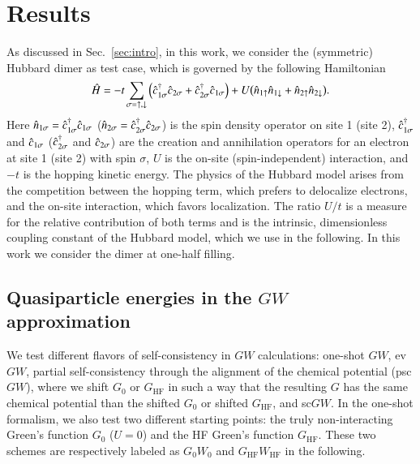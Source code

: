 \documentclass[aps,prb,reprint,superscriptaddress]{revtex4-1}
\begin{document}
\section{Results}
\label{sec:Results}
As discussed in Sec.~\ref{sec:intro}, in this work, we consider the (symmetric) Hubbard dimer as test case, which is governed by the following Hamiltonian
\begin{equation}
 \label{Eqn:Hamiltonian}
 \Hat{H} 
 =-t \sum_{\sigma=\uparrow,\downarrow} \qty( \Hat{c}^{\dagger}_{1\sigma} \Hat{c}_{2\sigma} + \Hat{c}^{\dagger}_{2\sigma} \Hat{c}_{1\sigma} )
 + U \qty( \Hat{n}_{1\uparrow} \Hat{n}_{1\downarrow}+\Hat{n}_{2\uparrow} \Hat{n}_{2\downarrow} ).
 \end{equation}
Here $\Hat{n}_{1\sigma}=\Hat{c}^{\dagger}_{1\sigma} \Hat{c}_{1\sigma}$ ($\Hat{n}_{2\sigma}=\Hat{c}^{\dagger}_{2\sigma} \Hat{c}_{2\sigma}$) is the spin density operator on site 1 (site 2), $\Hat{c}^{\dagger}_{1\sigma}$ and $\Hat{c}_{1\sigma}$ ($\Hat{c}^{\dagger}_{2\sigma}$ and $\Hat{c}_{2\sigma}$) are the creation and annihilation operators for an electron at site 1 (site 2) with spin $\sigma$, $U$ is the on-site (spin-independent) interaction, and $-t$ is the hopping kinetic energy. The physics of the Hubbard model arises from the competition between the hopping term, which prefers to delocalize electrons, and the on-site interaction, which favors localization. The ratio $U/t$ is a measure for the relative contribution of both terms and is the intrinsic, dimensionless coupling constant of the Hubbard model, which we use in the following. 
In this work we consider the dimer at one-half filling.


\subsection{Quasiparticle energies in the $GW$ approximation}
We test different flavors of self-consistency in $GW$ calculations: one-shot $GW$, ev$GW$, partial self-consistency through the alignment of the chemical potential (psc$GW$), where we shift $G_0$ or $G_\text{HF}$ in such a way that the resulting $G$ has the same chemical potential than the shifted $G_0$ or shifted $G_\text{HF}$,\citep{Schindlmayr_1997} and sc$GW$. 
In the one-shot formalism, we also test two different starting points: the truly non-interacting Green's function $G_0$ ($U=0$) and the HF Green's function $G_\text{HF}$.
These two schemes are respectively labeled as $G_0W_0$ and $G_\text{HF}W_\text{HF}$ in the following. 
\end{document}
